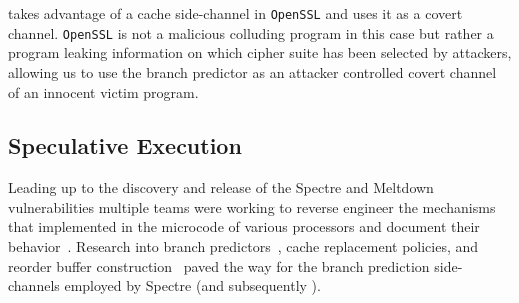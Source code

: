\speculake takes advantage of a cache side-channel in \texttt{OpenSSL} and uses
it as a covert channel. \texttt{OpenSSL} is not a malicious colluding program in
this case but rather a program leaking information on which cipher suite has
been selected by attackers, allowing us to use the branch predictor as an
attacker controlled covert channel of an innocent victim program.




\subsection{Speculative Execution}

Leading up to the discovery and release of the Spectre and Meltdown
vulnerabilities multiple teams were working to reverse engineer the mechanisms
that implemented in the microcode of various processors and document their
behavior~\cite{intel-instruction-tables,project_zero,measuring-cache,measuring-rob}.
Research into branch predictors~\cite{godbolt2016branch}, cache replacement
policies, and reorder buffer construction~\cite{measuring-rob} paved the way for
the branch prediction side-channels employed by Spectre (and subsequently
\speculake).

